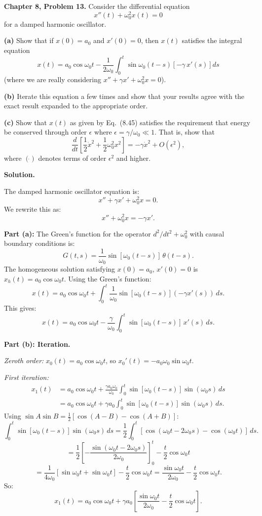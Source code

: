 \documentclass[12pt]{article}
\begin{document}
\textbf{Chapter 8, Problem 13.} Consider the differential equation
\[
x''(t) + \omega_0^2 x(t) = 0
\]
for a damped harmonic oscillator.

\textbf{(a)} Show that if $x(0) = a_0$ and $x'(0) = 0$, then $x(t)$ satisfies the integral equation
\[
x(t) = a_0\cos\omega_0 t - \frac{1}{2\omega_0}\int_0^t\sin\omega_0(t-s)\left[-\gamma\,x'(s)\right]ds
\]
(where we are really considering $x''+\gamma x' + \omega_0^2 x = 0$).

\textbf{(b)} Iterate this equation a few times and show that your results agree with the exact result expanded to the appropriate order.

\textbf{(c)} Show that $x(t)$ as given by Eq.\ (8.45) satisfies the requirement that energy be conserved through order $\epsilon$ where $\epsilon = \gamma/\omega_0 \ll 1$. That is, show that
\[
\frac{d}{dt}\left[\frac{1}{2}\dot{x}^2 + \frac{1}{2}\omega_0^2 x^2\right] = -\gamma \dot{x}^2 + O(\epsilon^2),
\]
where $(\dot{})$ denotes terms of order $\epsilon^2$ and higher.

\bigskip
\textbf{Solution.}

The damped harmonic oscillator equation is:
\[
x'' + \gamma x' + \omega_0^2 x = 0.
\]
We rewrite this as:
\[
x'' + \omega_0^2 x = -\gamma x'.
\]

\textbf{Part (a):}
The Green's function for the operator $d^2/dt^2 + \omega_0^2$ with causal boundary conditions is:
\[
G(t,s) = \frac{1}{\omega_0}\sin[\omega_0(t-s)]\,\theta(t-s).
\]
The homogeneous solution satisfying $x(0)=a_0$, $x'(0)=0$ is $x_h(t) = a_0\cos\omega_0 t$. Using the Green's function:
\[
x(t) = a_0\cos\omega_0 t + \int_0^t \frac{1}{\omega_0}\sin[\omega_0(t-s)](-\gamma x'(s))\,ds.
\]
This gives:
\[
\boxed{x(t) = a_0\cos\omega_0 t - \frac{\gamma}{\omega_0}\int_0^t \sin[\omega_0(t-s)]\,x'(s)\,ds.}
\]

\textbf{Part (b): Iteration.}

\emph{Zeroth order:} $x_0(t) = a_0\cos\omega_0 t$, so $x_0'(t) = -a_0\omega_0\sin\omega_0 t$.

\emph{First iteration:}
\begin{align*}
x_1(t) &= a_0\cos\omega_0 t + \frac{\gamma a_0\omega_0}{\omega_0}\int_0^t \sin[\omega_0(t-s)]\sin(\omega_0 s)\,ds \\
&= a_0\cos\omega_0 t + \gamma a_0\int_0^t \sin[\omega_0(t-s)]\sin(\omega_0 s)\,ds.
\end{align*}
Using $\sin A\sin B = \frac{1}{2}[\cos(A-B)-\cos(A+B)]$:
\[
\int_0^t \sin[\omega_0(t-s)]\sin(\omega_0 s)\,ds = \frac{1}{2}\int_0^t[\cos(\omega_0 t - 2\omega_0 s)-\cos(\omega_0 t)]\,ds.
\]
\[
= \frac{1}{2}\left[-\frac{\sin(\omega_0 t-2\omega_0 s)}{2\omega_0}\right]_0^t - \frac{t}{2}\cos\omega_0 t
\]
\[
= \frac{1}{4\omega_0}[\sin\omega_0 t + \sin\omega_0 t] - \frac{t}{2}\cos\omega_0 t = \frac{\sin\omega_0 t}{2\omega_0} - \frac{t}{2}\cos\omega_0 t.
\]
So:
\[
x_1(t) = a_0\cos\omega_0 t + \gamma a_0\left[\frac{\sin\omega_0 t}{2\omega_0}-\frac{t}{2}\cos\omega_0 t\right].
\]
\end{document}
